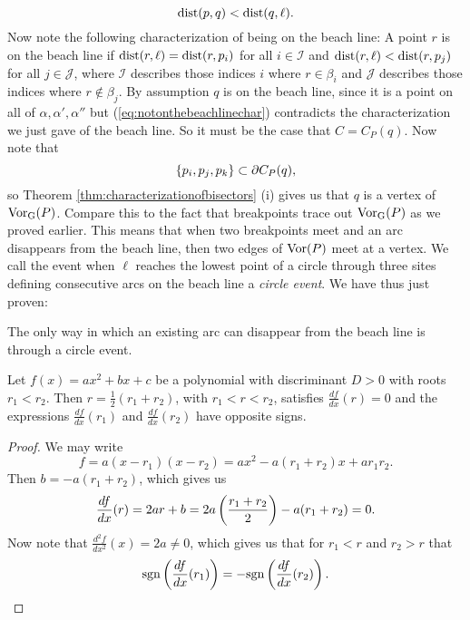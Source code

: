 \begin{equation} \label{eq:notonthebeachlinechar}
    \operatorname{dist}(p, q) < \operatorname{dist}(q, \ell).
\end{equation}
Now note the following characterization of being on the beach line: A point $r$ is on the beach line if $\operatorname{dist}(r, \ell) = \operatorname{dist}(r, p_i)$ for all $i \in \mathcal{I}$ and $\operatorname{dist}(r, \ell) < \operatorname{dist}(r, p_j)$ for all $j \in \mathcal{J}$, where $\mathcal{I}$ describes those indices $i$ where $r \in \beta_i$ and $\mathcal{J}$ describes those indices where $r \not\in \beta_j$. By assumption $q$ is on the beach line, since it is a point on all of $\alpha, \alpha', \alpha''$ but (\ref{eq:notonthebeachlinechar}) contradicts the characterization we just gave of the beach line. So it must be the case that $C = C_P(q)$. Now note that
\[
    \{p_i, p_j, p_k\} \subset \partial C_P(q),
\]
so Theorem \ref{thm:characterizationofbisectors} (i) gives us that $q$ is a vertex of $\operatorname{Vor_{G}}(P)$. Compare this to the fact that breakpoints trace out $\operatorname{Vor_{G}}(P)$ as we proved earlier. This means that when two breakpoints meet and an arc disappears from the beach line, then two edges of $\operatorname{Vor}(P)$ meet at a vertex. We call the event when $\ell$ reaches the lowest point of a circle through three sites defining consecutive arcs on the beach line a \emph{circle event}. We have thus just proven:
\begin{lem}
The only way in which an existing arc can disappear from the beach line is through a circle event.
\end{lem}

\newpage
\begin{prop} \label{prop:highschool1}
Let $f(x) = a x^2 + b x + c$ be a polynomial with discriminant $D > 0$ with roots $r_1 < r_2$. Then $r = \tfrac{1}{2}(r_1 + r_2)$, with $r_1 < r < r_2$, satisfies $\displaystyle\frac{df}{dx}(r) = 0$ and the expressions $\displaystyle\frac{df}{dx}(r_1)$ and $\displaystyle\frac{df}{dx}(r_2)$ have opposite signs.
\end{prop}
\begin{proof}
We may write
\[
    f = a (x - r_1) (x - r_2) = a x^2 - a(r_1 + r_2) x + a r_1 r_2.
\]
Then $b = - a (r_1 + r_2)$, which gives us
\[
    \frac{df}{dx} (r) = 2 a r + b = 2 a \left(\frac{r_1 + r_2}{2}\right) - a (r_1 + r_2) = 0.
\]
Now note that $\displaystyle\frac{d^2 f}{d x^2}(x) = 2a \ne 0$, which gives us that for $r_1 < r$ and $r_2 > r$ that
\[
    \text{sgn} \left(\frac{df}{dx}(r_1)\right) = -\text{sgn} \left(\frac{df}{dx}(r_2)\right).
\]
\end{proof}

